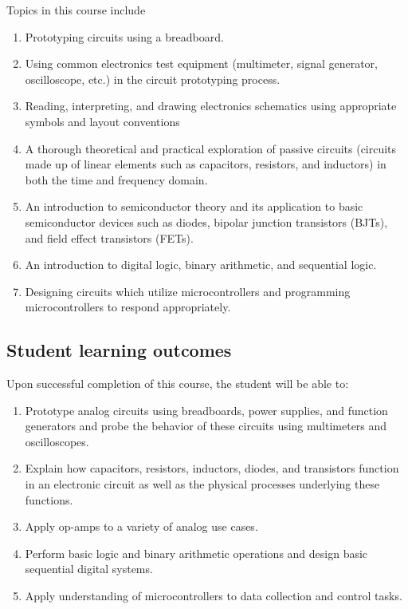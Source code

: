 \documentclass{syllabus}
\begin{document}
Topics in this course include
\begin{enumerate}[label=\textcolor{CarthageDark}{\bfseries\arabic*.}]
    \item Prototyping circuits using a breadboard.
\item Using common electronics test equipment (multimeter, signal generator, oscilloscope, etc.) in the circuit prototyping process.
\item Reading, interpreting, and drawing electronics schematics using appropriate symbols and layout conventions
\item A thorough theoretical and practical exploration of passive circuits (circuits made up of linear elements such as capacitors, resistors, and inductors) in both the time and frequency domain.
\item An introduction to semiconductor theory and its application to basic semiconductor devices  such as diodes, bipolar junction transistors (BJTs), and field effect transistors (FETs).
\item An introduction to digital logic, binary arithmetic, and sequential logic.
\item Designing circuits which utilize microcontrollers and programming microcontrollers to respond appropriately.

\end{enumerate}


\subsection*{Student learning outcomes} 

\noindent
Upon successful completion of this course, the student will be able to:
\begin{enumerate}[label=\textcolor{CarthageDark}{\bfseries\arabic*.}]
    \item Prototype analog circuits using breadboards, power supplies, and function generators and probe the behavior of these circuits using multimeters and oscilloscopes.
\item Explain how capacitors, resistors, inductors, diodes, and transistors function in an electronic circuit as well as the physical processes underlying these functions.
\item Apply op-amps to a variety of analog use cases.
\item Perform basic logic and binary arithmetic operations and design basic sequential digital systems.
\item Apply understanding of microcontrollers to data collection and control tasks.
\end{enumerate}
\end{document}
